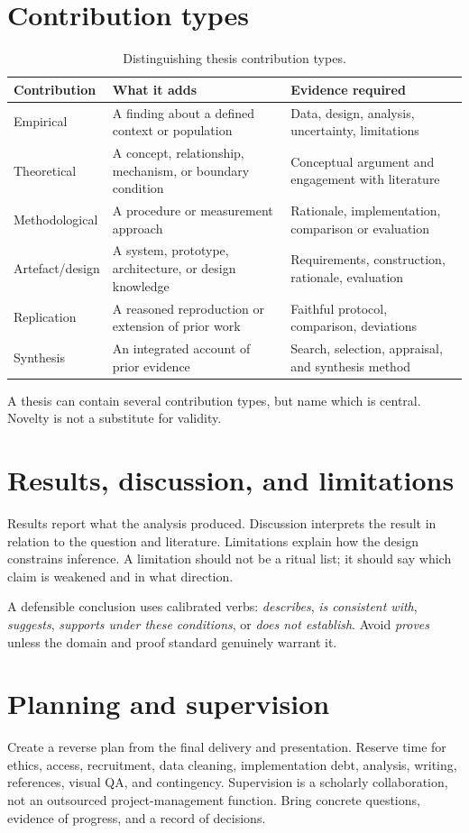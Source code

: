 \section{Contribution types}
\begin{longtable}{p{}p{}p{}}
\caption{Distinguishing thesis contribution types.}\\
\toprule
\textbf{Contribution} & \textbf{What it adds} & \textbf{Evidence required}\\
\midrule
Empirical & A finding about a defined context or population & Data, design, analysis, uncertainty, limitations\\
Theoretical & A concept, relationship, mechanism, or boundary condition & Conceptual argument and engagement with literature\\
Methodological & A procedure or measurement approach & Rationale, implementation, comparison or evaluation\\
Artefact/design & A system, prototype, architecture, or design knowledge & Requirements, construction, rationale, evaluation\\
Replication & A reasoned reproduction or extension of prior work & Faithful protocol, comparison, deviations\\
Synthesis & An integrated account of prior evidence & Search, selection, appraisal, and synthesis method\\
\bottomrule
\end{longtable}

A thesis can contain several contribution types, but name which is central. Novelty is not a substitute for validity.

\section{Results, discussion, and limitations}
Results report what the analysis produced. Discussion interprets the result in relation to the question and literature. Limitations explain how the design constrains inference. A limitation should not be a ritual list; it should say which claim is weakened and in what direction.

A defensible conclusion uses calibrated verbs: \emph{describes}, \emph{is consistent with}, \emph{suggests}, \emph{supports under these conditions}, or \emph{does not establish}. Avoid \emph{proves} unless the domain and proof standard genuinely warrant it.

\section{Planning and supervision}
Create a reverse plan from the final delivery and presentation. Reserve time for ethics, access, recruitment, data cleaning, implementation debt, analysis, writing, references, visual QA, and contingency. Supervision is a scholarly collaboration, not an outsourced project-management function. Bring concrete questions, evidence of progress, and a record of decisions.

